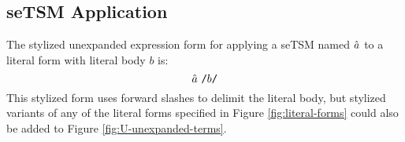 
\subsection{seTSM Application}\label{sec:U-uetsm-application}
The stylized unexpanded expression form for applying a seTSM named $\hat{a}$ to a literal form with literal body $b$ is:
\[
\hat{a}~\texttt{/}b\texttt{/}
\] 
This stylized form uses forward slashes to delimit the literal body, but stylized variants of any of the literal forms specified in Figure \ref{fig:literal-forms} could also be added to Figure \ref{fig:U-unexpanded-terms}. %

